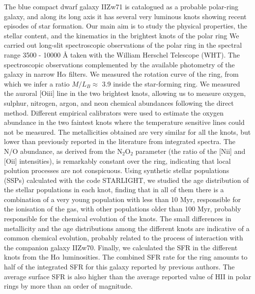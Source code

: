 \documentclass[structabstract]{aa}
\begin{document}
   \abstract
{}
{The blue compact dwarf galaxy IIZw71 is catalogued as a probable polar-ring galaxy, and along its long axis it has several
very luminous knots showing recent episodes of star formation. Our main aim is to study the physical properties, the stellar content, and the kinematics in the brightest knots of the polar ring}
{We carried out long-slit 
spectroscopic observations of the polar ring in the spectral range 3500 - 10000 {\AA} taken with the William Herschel Telescope (WHT).  The spectroscopic observations complemented by the available photometry of the galaxy in narrow H$\alpha$ filters.}
{ We measured the rotation curve of the ring, from which we infer a ratio $M/L_B \approx$ 3.9 inside the star-forming ring. 
We measured the auroral [O{\sc iii}] line in the two brightest knots, allowing us to measure oxygen, sulphur, nitrogen, argon, and neon chemical abundances  following the direct method. Different empirical calibrators were used to estimate the oxygen abundance in the two faintest knots where the temperature sensitive lines could not be measured. The metallicities obtained are very similar for all the knots, but lower than previously reported in the literature from integrated spectra. The N/O abundance, as derived from the N$_2$O$_2$ parameter (the ratio of the [N{\sc ii}] and [O{\sc ii}] intensities), is remarkably constant over the ring, indicating that local polution processes are not conspicuous.
Using synthetic stellar populations (SSPs) calculated with the code STARLIGHT, we studied the age distribution of the stellar populations in each knot, finding that in all of them there is a combination of a very young population with less than 10 Myr, responsible for the ionisation of the gas, with other populations older than 100 Myr, probably responsible for the chemical evolution of the knots. The small differences in metallicity and the age distributions among the different knots are  indicative of a common chemical evolution, probably related to the process of interaction with the companion galaxy IIZw70. Finally, we calculated the SFR in the different knots from the H$\alpha$ luminosities. The combined SFR rate for the ring amounts to half of the integrated SFR for this galaxy reported by previous authors. The average surface SFR is also higher than the average reported value of HII in polar rings by more than an order of magnitude.}
{} 
\maketitle
\end{document}
